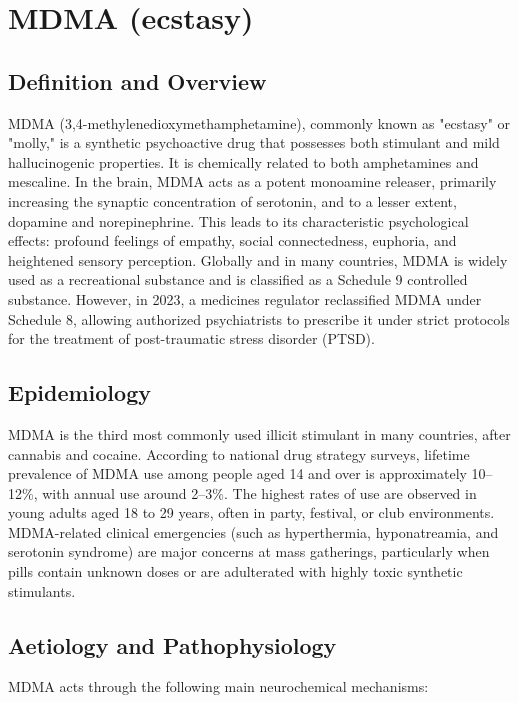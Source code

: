 \chapter{MDMA (ecstasy)}

\section*{Definition and Overview}
MDMA (3,4-methylenedioxymethamphetamine), commonly known as "ecstasy" or "molly," is a synthetic psychoactive drug that possesses both stimulant and mild hallucinogenic properties. It is chemically related to both amphetamines and mescaline. In the brain, MDMA acts as a potent monoamine releaser, primarily increasing the synaptic concentration of serotonin, and to a lesser extent, dopamine and norepinephrine. This leads to its characteristic psychological effects: profound feelings of empathy, social connectedness, euphoria, and heightened sensory perception. Globally and in many countries, MDMA is widely used as a recreational substance and is classified as a Schedule 9 controlled substance. However, in 2023, a medicines regulator reclassified MDMA under Schedule 8, allowing authorized psychiatrists to prescribe it under strict protocols for the treatment of post-traumatic stress disorder (PTSD).

\section*{Epidemiology}
MDMA is the third most commonly used illicit stimulant in many countries, after cannabis and cocaine. According to national drug strategy surveys, lifetime prevalence of MDMA use among people aged 14 and over is approximately 10--12\%, with annual use around 2--3\%. The highest rates of use are observed in young adults aged 18 to 29 years, often in party, festival, or club environments. MDMA-related clinical emergencies (such as hyperthermia, hyponatreamia, and serotonin syndrome) are major concerns at mass gatherings, particularly when pills contain unknown doses or are adulterated with highly toxic synthetic stimulants.

\section*{Aetiology and Pathophysiology}
MDMA acts through the following main neurochemical mechanisms:

